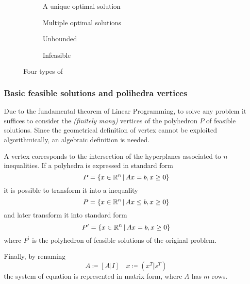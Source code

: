 \documentclass[english]{article}
\begin{document}
\begin{figure}[htbp]
  \bigskip
  \centering
  \begin{subfigure}[b]{0.495\textwidth}
    \bigskip
    \centering
    \caption{A unique optimal solution}
    \label{subfig:unique-solution}
    \bigskip
  \end{subfigure}
  \begin{subfigure}[b]{0.495\textwidth}
    \bigskip
    \centering
    \caption{Multiple optimal solutions}
    \label{subfig:multiple-solutions}
    \bigskip
  \end{subfigure}
  \bigskip
  \begin{subfigure}[b]{0.495\textwidth}
    \bigskip
    \centering
    \caption{Unbounded \LP}
    \label{subfig:unbounded-lp}
    \bigskip
  \end{subfigure}
  \begin{subfigure}[b]{0.495\textwidth}
    \bigskip
    \centering
    \caption{Infeasible \LP}
    \label{subfig:infeasible-lp}
    \bigskip
  \end{subfigure}
  \caption{Four types of \LP}
  \label{fig:lp-types}
  \bigskip
\end{figure}

\subsubsection{Basic feasible solutions and polihedra vertices}

Due to the fundamental theorem of Linear Programming, to solve any \LP problem it suffices to consider the \textit{(finitely many)} vertices of the polyhedron \(P\) of feasible solutions.
Since the geometrical definition of vertex cannot be exploited algorithmically, an algebraic definition is needed.

A vertex corresponds to the intersection of the hyperplanes associated to \(n\) inequalities.
If a polyhedra is expressed in standard form
\[ P = \left\{ x \in \mathbb{R}^n \, | \, Ax = b, x \geq 0 \right\}\]
it is possible to transform it into a inequality
\[ P = \left\{ x \in \mathbb{R}^n \, | \, Ax \leq b, x \geq 0 \right\}\]
and later transform it into standard form
\[ P^\prime = \left\{ x \in \mathbb{R}^n \, | \, Ax = b, x \geq 0 \right\} \]
where \(P^\prime\) is the polyhedron of feasible solutions of the original problem.

Finally, by renaming
\[ A \coloneq \left[ A | I \right] \quad x \coloneq \left( x^T | s^T \right) \]
the system of equation is represented in matrix form, where \(A\) has \(m\) rows.
\end{document}
